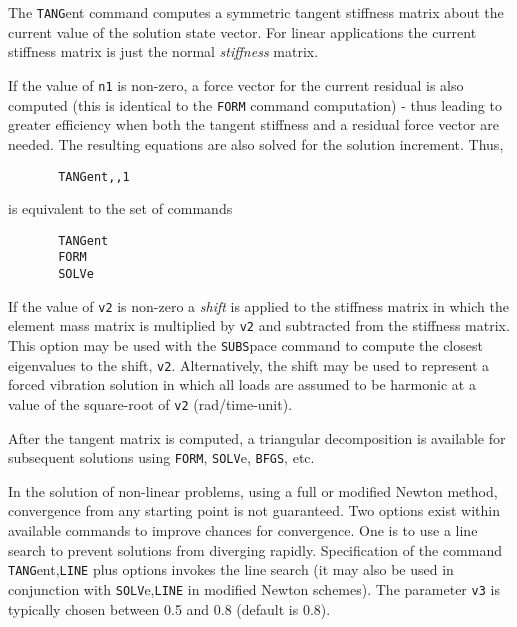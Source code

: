 \\{\smallskip}
 \\{\smallskip}
\headb

The {\tt TANG}ent command computes a symmetric tangent stiffness matrix
about the current value of the solution state vector.  For
linear applications the current stiffness matrix is just the
normal {\it stiffness} matrix.

If the value of {\tt n1} is non-zero, a  force  vector  for
the  current residual is also computed (this is identical to
the {\tt FORM} command computation) - thus leading to greater
efficiency when both the tangent stiffness and a residual
force vector are needed.  The resulting equations are also solved
for the solution increment.  Thus, 
\begin{verbatim}
       TANGent,,1
\end{verbatim}
is equivalent to the set of commands
\begin{verbatim}
       TANGent
       FORM
       SOLVe
\end{verbatim}

If the value of {\tt v2} is non-zero a {\it shift} is applied
to the stiffness matrix in which the element mass matrix is
multiplied by {\tt v2} and subtracted from the stiffness matrix.
This option may be used with the {\tt SUBS}pace command to
compute the closest eigenvalues to the shift, {\tt v2}.   Alternatively,
the shift may be used to represent a forced vibration solution
in which all loads are assumed to be  harmonic
at a value of the square-root of {\tt v2} (rad/time-unit).

After the tangent matrix is computed, a triangular
decomposition is available for subsequent solutions using
{\tt FORM}, {\tt SOLV}e, {\tt BFGS}, etc.

In the solution of non-linear problems, using a full or
modified Newton method, convergence from any starting point
is not guaranteed.  Two options exist within available
commands to improve chances for convergence.  One is to use
a line search to prevent solutions from diverging rapidly.
Specification of the command {\tt TANG}ent,{\tt LINE} plus options
invokes the line search (it may also be used in  conjunction
with {\tt SOLV}e,{\tt LINE} in modified Newton schemes).  The
parameter {\tt v3} is typically chosen between 0.5 and 0.8
(default is 0.8).

